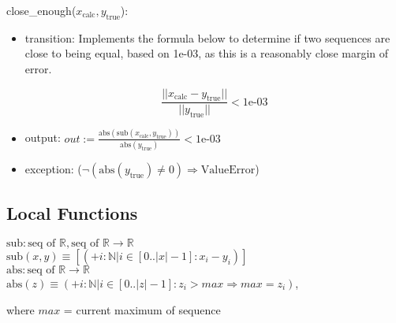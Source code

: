 \documentclass[12pt]{article}
\begin{document}
\begin{enumerate}[a)]
\noindent close\_enough($x_\text{calc}, y_\text{true}$):
\begin{itemize}
\item transition: Implements the formula below to determine if two sequences are close to 
being equal, based on \text1e-03, as this is a reasonably close margin of error. 

\begin{equation}
\frac{|| x_\text{calc} - y_\text{true} ||} {||y_\text{true}||} < \text{1e-03} \label{Eq_calcError}
\end{equation} 

\item output: $out := \frac{\text{abs}(\text{sub}(x_\text{calc}, y_\text{true}))} 
{\text{abs}(y_\text{true})} < \text{1e-03}$
\item exception: ($\neg (\text{abs}(y_\text{true}) \neq 0) \Rightarrow \text{ValueError}$)
\end{itemize}

\subsection*{Local Functions}

\noindent $\text{sub}: \text{seq of } \mathbb{R}, \text{seq of } \mathbb{R} \rightarrow 
\mathbb{R}$\\
\noindent $\text{sub}(x, y) \equiv [(+ i: \mathbb{N} | i \in [0..|x|-1] :
x_i - y_i)]$\\

\noindent $\text{abs}: \text{seq of } \mathbb{R} \rightarrow \mathbb{R}$\\
\noindent $\text{abs}(z) \equiv (+ i: \mathbb{N} | i \in [0..|z|-1] :
z_i > max \Rightarrow max = z_i)$,

where $max$ = current maximum of sequence

\newpage


\end{enumerate}
\end{document}
